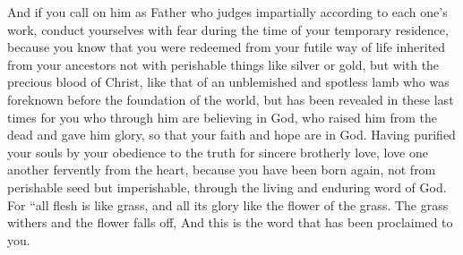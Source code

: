 \begin{biblechapter}
\verse And if you call on him as Father who judges impartially according to each one’s work, conduct yourselves with fear during the time of your temporary residence,
\verse because you know that you were redeemed from your futile way of life inherited from your ancestors not with perishable things like silver or gold,
\verse but with the precious blood of Christ, like that of an unblemished and spotless lamb
\verse who was foreknown before the foundation of the world, but has been revealed in these last times for you
\verse who through him are believing in God, who raised him from the dead and gave him glory, so that your faith and hope are in God.
\verse Having purified your souls by your obedience to the truth for sincere brotherly love, love one another fervently from the heart,
\verse because you have been born again, not from perishable seed but imperishable, through the living and enduring word of God.
\verse For
\verse “all flesh is like grass, 
and all its glory like the flower of the grass. 
The grass withers and the flower falls off, And this is the word that has been proclaimed to you.
\end{biblechapter}

